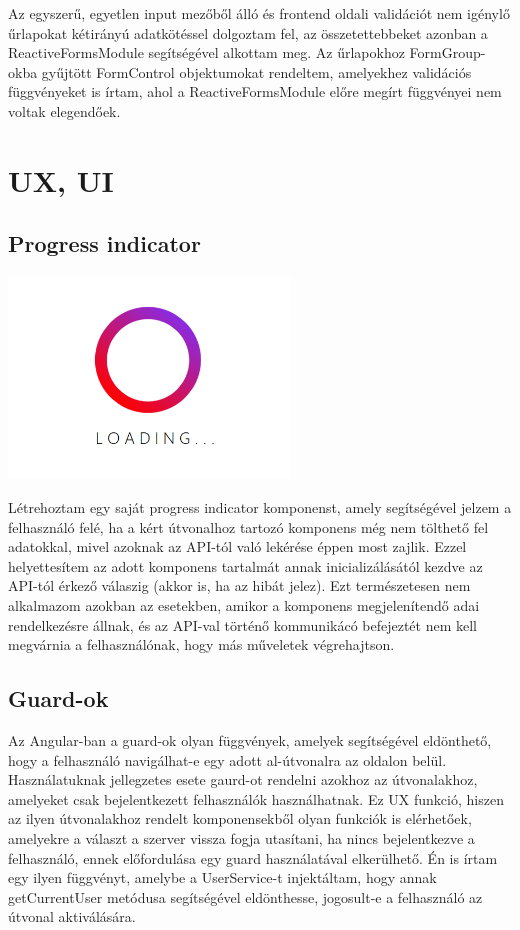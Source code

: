 \documentclass[a4paper,12pt]{report}
\theoremstyle{definition}
\theoremstyle{remark}
\begin{document}
Az egyszerű, egyetlen input mezőből álló és frontend oldali validációt nem igénylő űrlapokat kétirányú adatkötéssel dolgoztam fel, az összetettebbeket azonban a ReactiveFormsModule segítségével alkottam meg. Az űrlapokhoz FormGroup-okba gyűjtött FormControl objektumokat rendeltem, amelyekhez validációs függvényeket is írtam, ahol a ReactiveFormsModule előre megírt függvényei nem voltak elegendőek.

\section{UX, UI}

	\subsection{Progress indicator}

\begin{center}
\includegraphics[width=75mm]{progress_indicator}
\captionsetup{width=0.8\linewidth}
\end{center}

Létrehoztam egy saját progress indicator komponenst, amely segítségével jelzem a felhasználó felé, ha a kért útvonalhoz tartozó komponens még nem tölthető fel adatokkal, mivel azoknak az API-tól való lekérése éppen most zajlik. Ezzel helyettesítem az adott komponens tartalmát annak inicializálásától kezdve az API-tól érkező válaszig (akkor is, ha az hibát jelez). Ezt természetesen nem alkalmazom azokban az esetekben, amikor a komponens megjelenítendő adai rendelkezésre állnak, és az API-val történő kommunikácó befejeztét nem kell megvárnia a felhasználónak, hogy más műveletek végrehajtson.

	\subsection{Guard-ok}

Az Angular-ban a guard-ok olyan függvények, amelyek segítségével eldönthető, hogy a felhasználó navigálhat-e egy adott al-útvonalra az oldalon belül. Használatuknak jellegzetes esete gaurd-ot rendelni azokhoz az útvonalakhoz, amelyeket csak bejelentkezett felhasználók használhatnak. Ez UX funkció, hiszen az ilyen útvonalakhoz rendelt komponensekből olyan funkciók is elérhetőek, amelyekre a választ a szerver vissza fogja utasítani, ha nincs bejelentkezve a felhasználó, ennek előfordulása egy guard használatával elkerülhető. Én is írtam egy ilyen függvényt, amelybe a UserService-t injektáltam, hogy annak getCurrentUser metódusa segítségével eldönthesse, jogosult-e a felhasználó az útvonal aktiválására.
\end{document}
